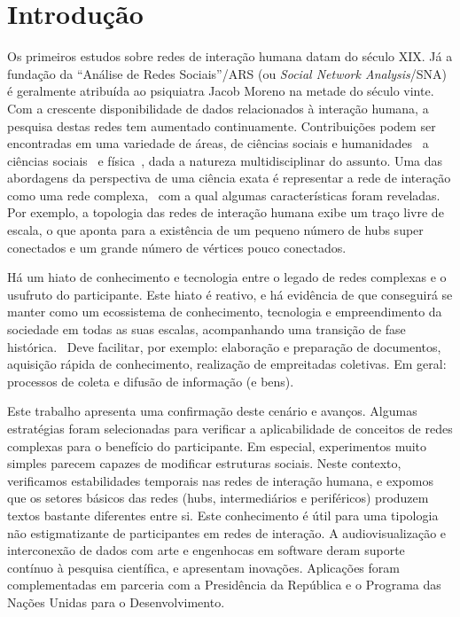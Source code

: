 \documentclass[a4paper,openright,12pt]{report} %
\begin{document}
\chapter{Introdução}
Os primeiros estudos sobre redes de interação humana datam do século XIX. Já a fundação da ``Análise de Redes Sociais''/ARS (ou \emph{Social Network Analysis}/SNA)
é geralmente atribuída ao psiquiatra Jacob Moreno na metade do século vinte.~\cite{newmanBook}
Com a crescente disponibilidade de dados relacionados à interação humana, a pesquisa destas redes tem aumentado continuamente.
Contribuições podem ser encontradas em uma variedade de áreas, de ciências sociais e humanidades~\cite{latour2013}
a ciências sociais~\cite{bird} e física~\cite{barabasiHumanDyn,newmanFriendship},
dada a natureza multidisciplinar do assunto.
Uma das abordagens da perspectiva de uma ciência exata é representar a rede de interação como uma rede
complexa,~\cite{barabasiHumanDyn,newmanFriendship}
com a qual algumas características foram reveladas.
Por exemplo, a topologia das redes de interação humana exibe um traço livre de escala,
o que aponta para a existência de um pequeno número de hubs super conectados
e um grande número de vértices pouco conectados.

Há um hiato de conhecimento e tecnologia entre o legado de redes complexas e o usufruto do participante.
Este hiato é reativo, e há evidência de que conseguirá se manter como um ecossistema de conhecimento, tecnologia
e empreendimento da sociedade em todas as suas escalas, acompanhando uma transição de fase histórica.~\cite{pentland1}
Deve facilitar, por exemplo:
elaboração e preparação de documentos, aquisição rápida de conhecimento,
realização de empreitadas coletivas.
Em geral: processos de coleta e difusão de informação (e bens).~\cite{pentland2}

Este trabalho apresenta uma confirmação deste cenário e avanços.
Algumas estratégias foram selecionadas para verificar a aplicabilidade
de conceitos de redes complexas para o benefício do participante.
Em especial, experimentos muito simples parecem capazes de modificar
estruturas sociais. Neste contexto, verificamos estabilidades temporais
nas redes de interação humana, e expomos que os setores básicos
das redes (hubs, intermediários e periféricos)
produzem textos bastante diferentes entre si.
Este conhecimento é útil para uma tipologia não estigmatizante
de participantes em redes de interação.
A audiovisualização e interconexão de dados com arte e engenhocas
em software deram suporte contínuo à pesquisa científica, e apresentam inovações.
Aplicações foram complementadas em parceria com a Presidência da República
e o Programa das Nações Unidas para o Desenvolvimento.
\end{document}
